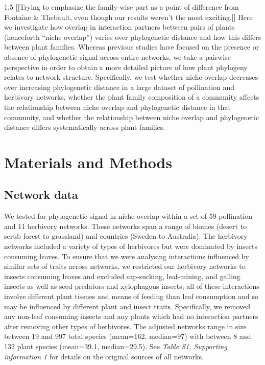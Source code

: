 \documentclass[12pt]{article}
\begin{document}
\begin{spacing}{1.5}
  [[Trying to emphasize the family-wise part as a point of difference from Fontaine \& Thebault, even though our results weren't the most exciting.]]
  Here we investigate how overlap in interaction partners between 
  pairs of plants (henceforth ``niche overlap'') varies over 
  phylogenetic distance and how this differs between plant families. 
  Whereas previous 
  studies have focused on the presence or absence of phylogenetic
  signal across entire networks, we take a pairwise perspective in
  order to obtain a more detailed picture of how plant phylogeny
  relates to network structure. Specifically,
  we test whether niche overlap decreases over increasing phylogenetic
  distance in a large dataset of pollination and herbivory networks, 
  whether the plant family composition of a community affects the
  relationship between niche overlap and phylogenetic distance in that 
  community, and whether the relationship between niche overlap and 
  phylogenetic distance differs systematically across plant families.


\section*{Materials and Methods}

  \subsection*{Network data}

    We tested for phylogenetic signal in niche overlap within a 
    set of 59 pollination and 11 herbivory networks. These networks span 
    a range of biomes (desert to scrub forest to grassland) and 
    countries (Sweden to Australia). The herbivory networks included a 
    variety of types of herbivores but were dominated by insects 
    consuming leaves. To ensure that we were analysing interactions 
    influenced by similar sets of traits across networks, we restricted 
    our herbivory networks to insects consuming leaves and excluded 
    sap-sucking, leaf-mining, and galling insects as well as seed 
    predators and xylophagous insects; all of these interactions involve 
    different plant tissues and means of feeding than leaf consumption 
    and so may be influenced by different plant and insect traits. 
    Specifically, we removed any non-leaf consuming insects and any 
    plants which had no interaction partners after removing other types  
    of herbivores. The adjusted networks range in size between 19 and 
    997 total species (mean=162, median=97) with between 8 and 132 
    plant species (mean=39.1, median=29.5). See \emph{Table S1, 
    Supporting information 1} for details on the original sources of all 
    networks. 



\end{spacing}
\end{document}
